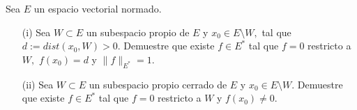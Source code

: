 Sea $E$ un espacio vectorial normado.
\begin{itemize}
    \item[(i)] Sea $W\subset E$ un subespacio propio de $E$ y $x_0\in E\setminus W,$ tal que $d:=dist(x_0,W)>0.$ Demuestre que existe $f\in E^*$ tal que $f=0$ restricto a $W,$ $f(x_0)=d$ y $\|f\|_{E^*}=1.$ 
    \item[(ii)] Sea $W\subset E$ un subespacio propio cerrado de $E$ y $x_0\in E\setminus W.$ Demuestre que existe $f\in E^*$ tal que $f=0$ restricto a $W$ y $f(x_0)\neq 0$. 
\end{itemize}
